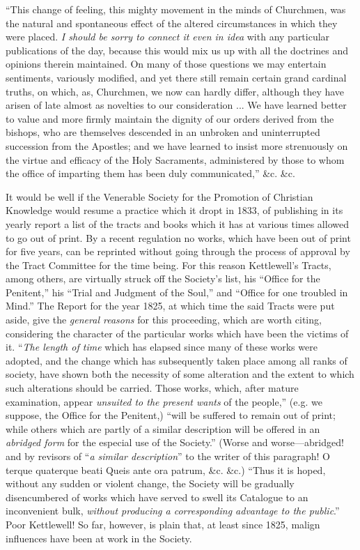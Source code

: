 ``This change of feeling, this mighty movement in
the minds of Churchmen, was the natural and spontaneous effect of the
altered circumstances in which they were placed. \emph{I should be sorry to
connect it even in idea} with any particular publications of the day,
because this would mix us up with all the doctrines and opinions therein
maintained. On many of those questions we may entertain sentiments,
variously modified, and yet there still remain certain grand cardinal
truths, on which, as, Churchmen, we now can hardly differ, although they
have arisen of late almost as novelties to our consideration ... We have
learned better to value and more firmly maintain the dignity of our
orders derived from the bishops, who are themselves descended in an
unbroken and uninterrupted succession from the Apostles; and we have
learned to insist more strenuously on the virtue and efficacy of the
Holy Sacraments, administered by those to whom the office of imparting
them has been duly communicated,'' \&c. \&c.

It would be well if the Venerable Society for the
Promotion of Christian Knowledge would resume a practice which it dropt
in 1833, of publishing in its yearly report a list of the tracts and
books which it has at various times allowed to go out of print. By a
recent regulation no works, which have been out of print for five years,
can be reprinted without going through the process of approval by the
Tract Committee for the time being. For this reason Kettlewell's Tracts,
among others, are virtually struck off the Society's list, his ``Office
for the Penitent,'' his ``Trial and Judgment of the Soul,'' and ``Office for
one troubled in Mind.'' The Report for the year 1825, at which time the
said Tracts were put aside, give the \emph{general reasons} for this
proceeding, which are worth citing, considering the character of the
particular works which have been the victims of it. ``\emph{The length of
time} which has elapsed since many of these works were adopted, and
the change which has subsequently taken place among all ranks of
society, have shown both the necessity of some alteration and the extent to which such alterations should be carried. Those works, which,
after mature examination, appear \emph{unsuited to the present wants} of
the people,'' (e.g. we suppose, the Office for the Penitent,) ``will be
suffered to remain out of print; while others which are partly of a
similar description will be offered in an \emph{abridged form} for the
especial use of the Society.'' (Worse and worse—abridged! and by
revisors of ``\emph{a similar description}'' to the writer of this
paragraph! O terque quaterque beati Queis ante ora patrum, \&c.
\&c.) ``Thus it is hoped, without any sudden or violent change, the
Society will be gradually disencumbered of works which have served to
swell its Catalogue to an inconvenient bulk, \emph{without producing a
corresponding advantage to the public}.'' Poor Kettlewell! So far,
however, is plain that, at least since 1825, malign influences have been
at work in the Society.

